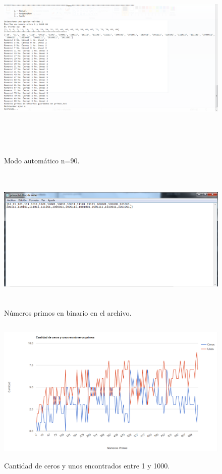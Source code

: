 		\begin{figure}[H]
			\begin{center}
				\includegraphics[width=\linewidth, height=10cm]{img/primos-manual.png}
				\caption{Modo automático n=90.}
				\label{fig:primos3}
			\end{center}
		\end{figure}
			\begin{figure}[H]
				\begin{center}
					\includegraphics[width=\linewidth, height=7cm]{img/primos-manual-salida.png}
					\caption{Números primos en binario en el archivo.}
					\label{fig:primos4}
				\end{center}
			\end{figure}
	\begin{figure}[H]
		\begin{center}
			\includegraphics[width=\linewidth, height=7cm]{img/primos.png}
			\caption{Cantidad de ceros y unos encontrados entre 1 y 1000.}
			\label{fig:grafica}
		\end{center}
	\end{figure}